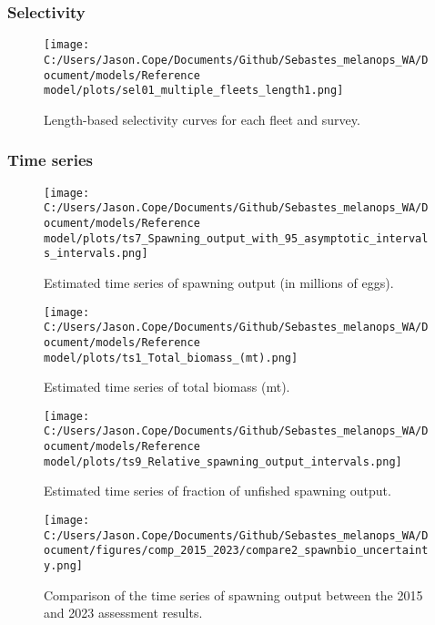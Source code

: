 \documentclass[11pt,
  english,
  letterpaper,
]{article}
\begin{document}
\pagebreak

\hypertarget{selectivity}{%
\subsubsection{Selectivity}\label{selectivity}}

\begin{figure}
\centering
\texttt{[image: C:/Users/Jason.Cope/Documents/Github/Sebastes\_melanops\_WA/Document/models/Reference model/plots/sel01\_multiple\_fleets\_length1.png]}
\caption{Length-based selectivity curves for each fleet and survey.\label{fig:fleet_selectivity}}
\end{figure}

\pagebreak

\hypertarget{time-series}{%
\subsubsection{Time series}\label{time-series}}

\begin{figure}
\centering
\texttt{[image: C:/Users/Jason.Cope/Documents/Github/Sebastes\_melanops\_WA/Document/models/Reference model/plots/ts7\_Spawning\_output\_with\_95\_asymptotic\_intervals\_intervals.png]}
\caption{Estimated time series of spawning output (in millions of eggs).\label{fig:ssb}}
\end{figure}

\pagebreak

\begin{figure}
\centering
\texttt{[image: C:/Users/Jason.Cope/Documents/Github/Sebastes\_melanops\_WA/Document/models/Reference model/plots/ts1\_Total\_biomass\_(mt).png]}
\caption{Estimated time series of total biomass (mt).\label{fig:tot-bio}}
\end{figure}

\pagebreak

\begin{figure}
\centering
\texttt{[image: C:/Users/Jason.Cope/Documents/Github/Sebastes\_melanops\_WA/Document/models/Reference model/plots/ts9\_Relative\_spawning\_output\_intervals.png]}
\caption{Estimated time series of fraction of unfished spawning output.\label{fig:depl}}
\end{figure}

\pagebreak

\begin{figure}
\centering
\texttt{[image: C:/Users/Jason.Cope/Documents/Github/Sebastes\_melanops\_WA/Document/figures/comp\_2015\_2023/compare2\_spawnbio\_uncertainty.png]}
\caption{Comparison of the time series of spawning output between the 2015 and 2023 assessment results.\label{fig:comp_ssb}}
\end{figure}
\end{document}
